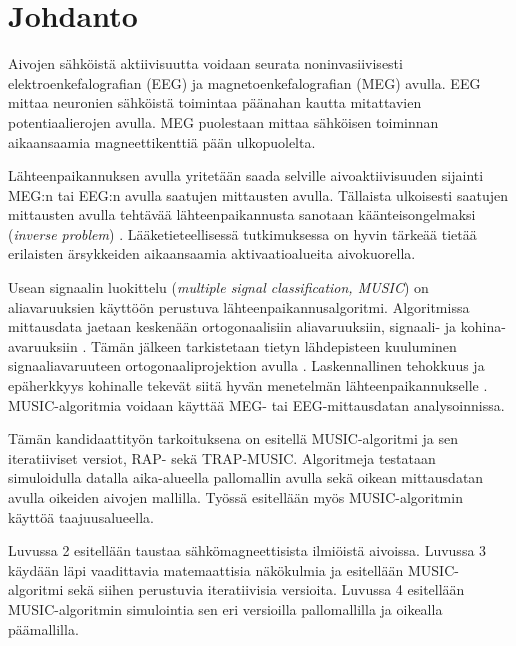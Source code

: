 \section{Johdanto}

Aivojen sähköistä aktiivisuutta voidaan seurata noninvasiivisesti elektroenkefalografian (EEG) ja magnetoenkefalografian (MEG) avulla. EEG mittaa neuronien sähköistä toimintaa päänahan kautta mitattavien potentiaalierojen avulla. MEG puolestaan mittaa sähköisen toiminnan aikaansaamia magneettikenttiä pään ulkopuolelta. \citep{Hamalainen1993MagnetoencephalographytheoryBrain}

Lähteenpaikannuksen avulla yritetään saada selville aivoaktiivisuuden sijainti MEG:n tai EEG:n avulla saatujen mittausten avulla. Tällaista ulkoisesti saatujen mittausten avulla tehtävää lähteenpaikannusta sanotaan käänteisongelmaksi (\textit{inverse problem}) \citep[s. 2]{hansen2010meg}. Lääketieteellisessä tutkimuksessa on hyvin tärkeää tietää erilaisten ärsykkeiden aikaansaamia aktivaatioalueita aivokuorella. 

Usean signaalin luokittelu (\textit{multiple signal classification, MUSIC}) \citep{Schmidt1986MultipleEstimation} on aliavaruuksien käyttöön perustuva lähteenpaikannusalgoritmi. Algoritmissa mittausdata jaetaan keskenään ortogonaalisiin aliavaruuksiin, signaali- ja kohina-avaruuksiin \citep{Schmidt1986MultipleEstimation, Mosher1999SourceMUSIC}. Tämän jälkeen tarkistetaan tietyn lähdepisteen kuuluminen signaaliavaruuteen ortogonaaliprojektion avulla \citep{Mosher1999SourceMUSIC}. Laskennallinen tehokkuus ja epäherkkyys kohinalle tekevät siitä hyvän menetelmän lähteenpaikannukselle \citep{Makela2018TruncatedLocalization}. MUSIC-algoritmia voidaan käyttää MEG- tai EEG-mittausdatan analysoinnissa.

Tämän kandidaattityön tarkoituksena on esitellä MUSIC-algoritmi ja sen iteratiiviset versiot, RAP- sekä TRAP-MUSIC. Algoritmeja testataan simuloidulla datalla aika-alueella pallomallin avulla sekä oikean mittausdatan avulla oikeiden aivojen mallilla. Työssä esitellään myös MUSIC-algoritmin käyttöä taajuusalueella.

Luvussa 2 esitellään taustaa sähkömagneettisista ilmiöistä aivoissa. Luvussa 3 käydään läpi vaadittavia matemaattisia näkökulmia ja esitellään MUSIC-algoritmi sekä siihen perustuvia iteratiivisia versioita. Luvussa 4 esitellään MUSIC-algoritmin simulointia sen eri versioilla pallomallilla ja oikealla päämallilla.